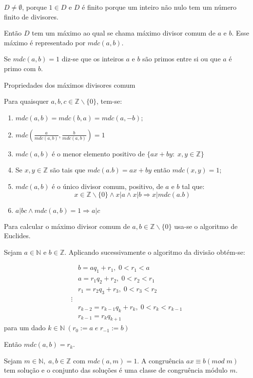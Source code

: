 $D \neq \emptyset$, porque $1 \in D$ e $D$ é finito porque um inteiro não nulo tem um número finito de divisores.

Então $D$ tem um máximo ao qual se chama máximo divisor comum de $a$ e $b$. Esse máximo é representado por $mdc(a,b)$.

Se $mdc(a,b)=1$ diz-se que os inteiros $a$ e $b$ são primos entre si ou que $a$ é primo com $b$.

Propriedades dos máximos divisores comum

Para quaisquer $a,b,c \in \mathbb{Z} \backslash \{0\}$, tem-se:
\begin{enumerate}
    \item $mdc(a,b)=mdc(b,a)=mdc(a,-b);$
    \item $mdc \left(\frac{a}{mdc(a,b)},\frac{b}{mdc(a,b)}\right)=1$
    \item $mdc(a,b)$ é o menor elemento positivo de $\{ax + by:\;x,y \in \mathbb{Z}\}$
    \item Se $x,y \in \mathbb{Z}$ são tais que $mdc(a.b)=ax + by$ então $mdc(x,y)=1$;
    \item $mdc(a,b)$ é o único divisor comum, positivo, de $a$ e $b$ tal que:
    $$x \in \mathbb{Z}\backslash \{0\} \land x|a \land x|b \Rightarrow x|mdc(a.b)$$
    \item $a|bc \land mdc(a,b)=1 \Rightarrow a|c$
\end{enumerate}
Para calcular o máximo divisor comum de $a,b \in \mathbb{Z}\backslash\{0\}$ usa-se o algoritmo de Euclides.

\begin{teorema} 
\label{teo:AlgoritmoEuclides}
Sejam $a \in \mathbb{N}$ e $b \in \mathbb{Z}$. Aplicando sucessivamente o algoritmo da divisão obtém-se: 

\begin{align*}
    & b=aq_1 + r_1,\;0 < r_1 < a\\
    & a=r_1q_2 + r_2,\;0 < r_2 < r_1\\
    &r_1=r_2q_3 + r_3, \;0 < r_3 < r_2\\
                \vdots\\
    &r_{k-2}=r_{k-1}q_k + r_k, \;0 < r_k < r_{k-1}\\
    &r_{k-1}=r_kq_{k+1}
\end{align*}
para um dado $k \in \mathbb{N}\;(r_0:=a\;e\;r_{-1}:=b)$

Então $mdc(a,b)=r_k$.
\end{teorema}

\begin{proposicao}
Sejam $m \in \mathbb{N},\; a,b \in \mathbb{Z}$ com $mdc(a,m)=1$. A congruência $ax \equiv b(mod\;m)$ tem solução e o conjunto das soluções é uma classe de congruência módulo $m$.
\end{proposicao}

